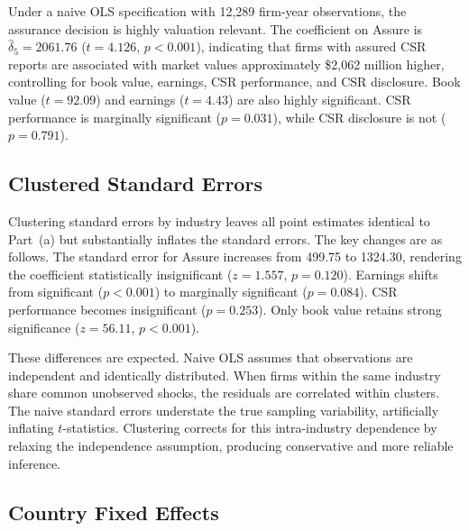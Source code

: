 \documentclass[11pt, a4paper]{article}
\begin{document}
\begin{table}[H]
	\centering
	
	\caption{OLS regression results for equation~(Q3).}\label{tab:q3a}
\end{table}

Under a naive OLS specification with 12,289 firm-year observations, the assurance decision is highly valuation relevant. The coefficient on Assure is \(\hat{\delta}_5 = 2061.76\) (\(t = 4.126\), \(p < 0.001\)), indicating that firms with assured CSR reports are associated with market values approximately \$2,062 million higher, controlling for book value, earnings, CSR performance, and CSR disclosure. Book value (\(t = 92.09\)) and earnings (\(t = 4.43\)) are also highly significant. CSR performance is marginally significant (\(p = 0.031\)), while CSR disclosure is not (\(p = 0.791\)).

\subsection{Clustered Standard Errors}

\begin{table}[H]
	\centering
	
	\caption{Regression with standard errors clustered by industry.}\label{tab:q3b}
\end{table}

Clustering standard errors by industry leaves all point estimates identical to Part~(a) but substantially inflates the standard errors. The key changes are as follows. The standard error for Assure increases from 499.75 to 1324.30, rendering the coefficient statistically insignificant (\(z = 1.557\), \(p = 0.120\)). Earnings shifts from significant (\(p < 0.001\)) to marginally significant (\(p = 0.084\)). CSR performance becomes insignificant (\(p = 0.253\)). Only book value retains strong significance (\(z = 56.11\), \(p < 0.001\)).

These differences are expected. Naive OLS assumes that observations are independent and identically distributed. When firms within the same industry share common unobserved shocks, the residuals are correlated within clusters. The naive standard errors understate the true sampling variability, artificially inflating \(t\)-statistics. Clustering corrects for this intra-industry dependence by relaxing the independence assumption, producing conservative and more reliable inference.

\subsection{Country Fixed Effects}
\end{document}
